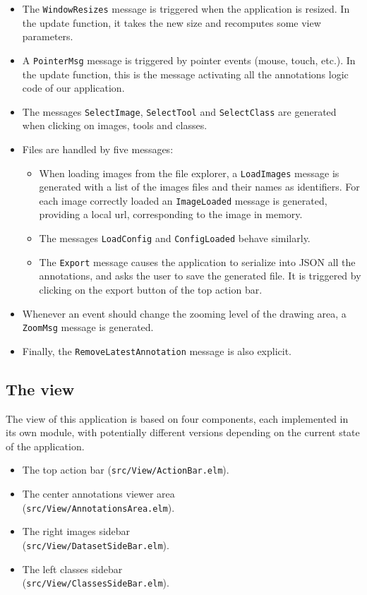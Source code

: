 

\begin{itemize}
\item The \verb|WindowResizes| message is triggered when the application is resized.
	In the update function, it takes the new size and recomputes some view parameters.
\item A \verb|PointerMsg| message is triggered by pointer events (mouse, touch, etc.).
	In the update function, this is the message activating
	all the annotations logic code of our application.
\item The messages \verb|SelectImage|, \verb|SelectTool| and \verb|SelectClass|
	are generated when clicking on images, tools and classes.
\item Files are handled by five messages:
	\begin{itemize}
	\item When loading images from the file explorer,
		a \verb|LoadImages| message is generated with a list of the images files
		and their names as identifiers.
		For each image correctly loaded an \verb|ImageLoaded| message is generated,
		providing a local url, corresponding to the image in memory.
    \item The messages \verb|LoadConfig| and \verb|ConfigLoaded| behave similarly.
    \item The \verb|Export| message causes the application to serialize into JSON
		all the annotations, and asks the user to save the generated file.
		It is triggered by clicking on the export button of the top action bar.
	\end{itemize}
\item Whenever an event should change the zooming level of the drawing area,
	a \verb|ZoomMsg| message is  generated.
\item Finally, the \verb|RemoveLatestAnnotation| message is also explicit.
\end{itemize}


\subsection{The view}

The view of this application is based on four components,
each implemented in its own module, with potentially different versions
depending on the current state of the application.
\begin{itemize}
\item The top action bar (\verb|src/View/ActionBar.elm|).
\item The center annotations viewer area\\(\verb|src/View/AnnotationsArea.elm|).
\item The right images sidebar\\(\verb|src/View/DatasetSideBar.elm|).
\item The left classes sidebar\\(\verb|src/View/ClassesSideBar.elm|).
\end{itemize}


